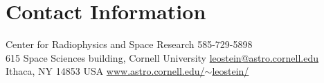 \section{\sc Contact Information}
Center for Radiophysics and Space Research            \hfill 585-729-5898 \\
615 Space Sciences building, Cornell University   \hfill \href{mailto:leostein@astro.cornell.edu}{leostein@astro.cornell.edu}\\
Ithaca, NY 14853 USA \hfill \href{http://www.astro.cornell.edu/~leostein/}{www.astro.cornell.edu/$\sim$leostein/}


